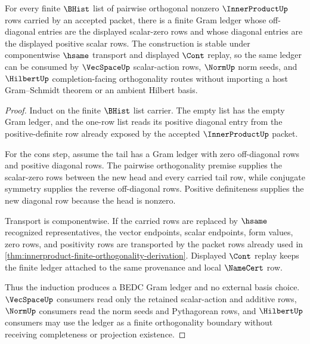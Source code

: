 \begin{theorem}
\label{thm:innerproduct-finite-gram-orthogonality-induction}
For every finite $\BHist$ list of pairwise orthogonal nonzero
$\InnerProductUp$ rows carried by an accepted packet, there is a finite Gram
ledger whose off-diagonal entries are the displayed scalar-zero rows and whose
diagonal entries are the displayed positive scalar rows. The construction is
stable under componentwise $\hsame$ transport and displayed $\Cont$ replay, so
the same ledger can be consumed by $\VecSpaceUp$ scalar-action rows,
$\NormUp$ norm seeds, and $\HilbertUp$ completion-facing orthogonality routes
without importing a host Gram--Schmidt theorem or an ambient Hilbert basis.
\end{theorem}
\begin{proof}
Induct on the finite $\BHist$ list carrier. The empty list has the empty Gram
ledger, and the one-row list reads its positive diagonal entry from the
positive-definite row already exposed by the accepted $\InnerProductUp$
packet.

For the cons step, assume the tail has a Gram ledger with zero off-diagonal
rows and positive diagonal rows. The pairwise orthogonality premise supplies
the scalar-zero rows between the new head and every carried tail row, while
conjugate symmetry supplies the reverse off-diagonal rows. Positive
definiteness supplies the new diagonal row because the head is nonzero.

Transport is componentwise. If the carried rows are replaced by $\hsame$
recognized representatives, the vector endpoints, scalar endpoints, form
values, zero rows, and positivity rows are transported by the packet rows
already used in \autoref{thm:innerproduct-finite-orthogonality-derivation}.
Displayed $\Cont$ replay keeps the finite ledger attached to the same
provenance and local $\NameCert$ row.

Thus the induction produces a BEDC Gram ledger and no external basis choice.
$\VecSpaceUp$ consumers read only the retained scalar-action and additive
rows, $\NormUp$ consumers read the norm seeds and Pythagorean rows, and
$\HilbertUp$ consumers may use the ledger as a finite orthogonality boundary
without receiving completeness or projection existence.
\end{proof}

